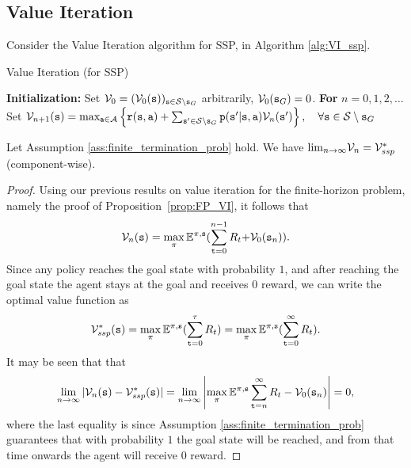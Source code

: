 \subsection{Value Iteration}
Consider the Value Iteration algorithm for SSP, in Algorithm \ref{alg:VI_ssp}.
\begin{algorithm}
\caption{Value Iteration (for SSP) }
\label{alg:VI_ssp}
\begin{algorithmic}[1]
\State \textbf{Initialization:} Set $\mathcal{V}_0 = (\mathcal{V}_0({\tt s}))_{{\tt s} \in \mathcal{S} \setminus {\tt s}_G}$ arbitrarily, $\mathcal{V}_0({\tt s}_G)=0$.
\State \textbf{For} {$n = 0, 1, 2, \ldots$}
    \State \quad Set $\mathcal{V}_{n + 1}({\tt s}) = \max_{{\tt a} \in \mathcal{A}} \left\{ {\tt r}({\tt s},{\tt a}) + \sum_{{\tt s}' \in \mathcal{S} \setminus {\tt s}_G} {\tt p}({\tt s}'|{\tt s},{\tt a})\mathcal{V}_n({\tt s}') \right\}, \quad \forall {\tt s} \in \mathcal{S} \setminus {\tt s}_G$
\end{algorithmic}
\end{algorithm}

\begin{theorem}\label{thm:_VI_ssp}
Let Assumption \ref{ass:finite_termination_prob} hold. We have ${\lim _{n \to \infty }}{\mathcal{V}_n} = \mathcal{V}_{ssp}^*$
(component-wise). 
\end{theorem}

\begin{proof}
Using our previous results on value iteration for the finite-horizon
problem, namely the proof of Proposition~\ref{prop:FP_VI}, it
follows that
\[{\mathcal{V}_n}({\tt s}) = \mathop {\max }\limits_\pi  {\ensuremath{\mathbb{E}}^{\pi,{\tt s}}}(\sum\limits_{{\tt t} = 0}^{n - 1} {{R_t} + } {\mathcal{V}_0}({{\tt s}_n})).\]
Since any policy reaches the goal state with probability $1$, and after reaching the goal state the agent stays at the goal and receives $0$ reward, we can write the optimal value function as
\[{\mathcal{V}_{ssp}^*}({\tt s}) = \mathop {\max }\limits_\pi  {\ensuremath{\mathbb{E}}^{\pi,{\tt s}}}(\sum\limits_{{\tt t} = 0}^\tau  {{R_t}} ) = \mathop {\max }\limits_\pi  {\ensuremath{\mathbb{E}}^{\pi,{\tt s}}}(\sum\limits_{{\tt t} = 0}^\infty  {{R_t}} ).\]
It may be seen that that
    \[\lim_{n \to \infty}|{\mathcal{V}_n}({\tt s}) - \mathcal{V}_{ssp}^*({\tt s})| = \lim_{n \to \infty} \left|\mathop {\max }\limits_\pi  {\ensuremath{\mathbb{E}}^{\pi,{\tt s}}} \sum\limits_{{\tt t} = n}^{\infty} {R_t} - {\mathcal{V}_0}({{\tt s}_n})\right| = 0,\]
where the last equality is since Assumption \ref{ass:finite_termination_prob} guarantees that with probability $1$ the goal state will be reached, and from that time onwards the agent will receive $0$ reward.
\end{proof}


